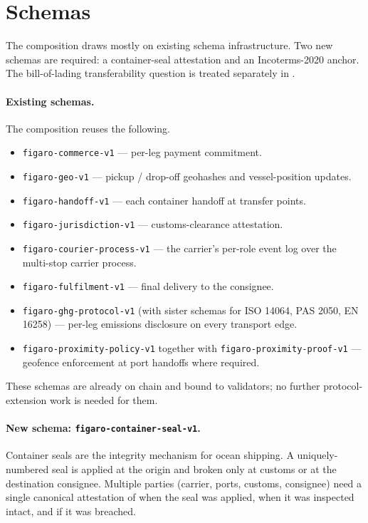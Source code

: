 \documentclass[11pt,a4paper]{article}
\theoremstyle{definition}
\theoremstyle{remark}
\begin{document}
\section{Schemas}
\label{sec:schemas}

The composition draws mostly on existing schema infrastructure.
Two new schemas are required: a container-seal attestation and an
Incoterms-2020 anchor. The bill-of-lading transferability
question is treated separately in .

\paragraph{Existing schemas.}
The composition reuses the following.

\begin{itemize}
  \item \texttt{figaro-commerce-v1} --- per-leg payment commitment.
  \item \texttt{figaro-geo-v1} --- pickup / drop-off geohashes and
    vessel-position updates.
  \item \texttt{figaro-handoff-v1} --- each container handoff at
    transfer points.
  \item \texttt{figaro-jurisdiction-v1} --- customs-clearance
    attestation.
  \item \texttt{figaro-courier-process-v1} --- the carrier's
    per-role event log over the multi-stop carrier process.
  \item \texttt{figaro-fulfilment-v1} --- final delivery to the
    consignee.
  \item \texttt{figaro-ghg-protocol-v1} (with sister schemas for
    ISO 14064, PAS 2050, EN 16258) --- per-leg emissions
    disclosure on every transport edge.
  \item \texttt{figaro-proximity-policy-v1} together with
    \texttt{figaro-proximity-proof-v1} --- geofence enforcement
    at port handoffs where required.
\end{itemize}

These schemas are already on chain and bound to validators; no
further protocol-extension work is needed for them.

\paragraph{New schema: \texttt{figaro-container-seal-v1}.}
Container seals are the integrity mechanism for ocean shipping.
A uniquely-numbered seal is applied at the origin and broken only
at customs or at the destination consignee. Multiple parties
(carrier, ports, customs, consignee) need a single canonical
attestation of when the seal was applied, when it was inspected
intact, and if it was breached.
\end{document}
